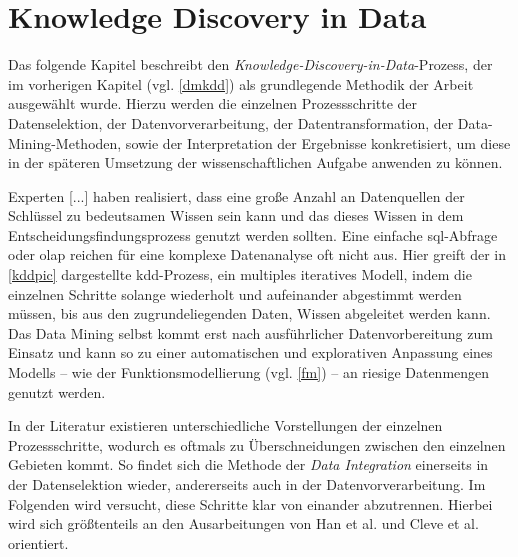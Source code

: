 \section{Knowledge Discovery in Data}
\label{kdd}

Das folgende Kapitel beschreibt den \textit{Knowledge-Discovery-in-Data}-Prozess, der im vorherigen Kapitel (vgl. \vref{dmkdd}) als grundlegende Methodik der Arbeit ausgewählt wurde. Hierzu werden die einzelnen Prozessschritte der Datenselektion, der Datenvorverarbeitung, der Datentransformation, der Data-Mining-Methoden, sowie der Interpretation der Ergebnisse konkretisiert, um diese in der späteren Umsetzung der wissenschaftlichen Aufgabe anwenden zu können.

\glqq Experten [...] haben realisiert, dass eine große Anzahl an Datenquellen der Schlüssel zu bedeutsamen Wissen sein kann und das dieses Wissen in dem Entscheidungsfindungsprozess genutzt werden sollten. Eine einfache \gls{sql}-Abfrage oder \gls{olap} reichen für eine komplexe Datenanalyse oft nicht aus.\grqq{} Hier greift der in \vref{kddpic} dargestellte \gls{kdd}-Prozess, ein multiples iteratives Modell, indem die einzelnen Schritte solange wiederholt und aufeinander abgestimmt werden müssen, bis aus den zugrundeliegenden Daten, Wissen abgeleitet werden kann. Das Data Mining selbst kommt erst nach ausführlicher Datenvorbereitung zum Einsatz und kann so zu einer automatischen und explorativen Anpassung eines Modells -- wie der Funktionsmodellierung (vgl. \vref{fm}) -- an riesige Datenmengen genutzt werden.

In der Literatur existieren unterschiedliche Vorstellungen der einzelnen Prozessschritte, wodurch es oftmals zu Überschneidungen zwischen den einzelnen Gebieten kommt. So findet sich die Methode der \textit{Data Integration} einerseits in der Datenselektion wieder, andererseits auch in der Datenvorverarbeitung. Im Folgenden wird versucht, diese Schritte klar von einander abzutrennen. Hierbei wird sich größtenteils an den Ausarbeitungen von Han et al. und Cleve et al. orientiert.


